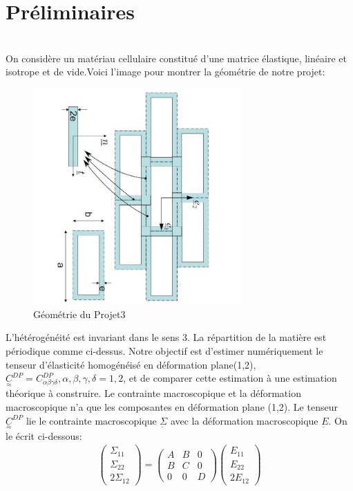 \documentclass{article}
\newcommand\waveC{\underset{\approx}{C}}
\begin{document}
\section{Préliminaires}\leavevmode \\
On considère un matériau cellulaire constitué d'une matrice élastique, linéaire et isotrope et de vide.Voici l'image pour montrer la géométrie de notre projet: 
\begin{figure}[h!]
    \begin{center}
    \includegraphics[width=8cm]{img/Géométrie_Projet3.JPG}
    \end{center}
    \caption{Géométrie du Projet3}
    \label{fig_géo générale}
\end{figure}
\par
L'hétérogénéité est invariant dans le sens 3. La répartition de la matière est périodique comme ci-dessus. Notre objectif est d'estimer numériquement le tenseur d'élasticité homogénéisé en déformation plane(1,2), $\waveC^{DP}=C^{DP}_{\alpha\beta\gamma\delta},\alpha,\beta,\gamma,\delta=1,2$, et de comparer cette estimation à une estimation théorique à construire. Le contrainte macroscopique et la déformation macroscopique n'a que les composantes en déformation plane (1,2). Le tenseur $\waveC^{DP}$ lie le contrainte macroscopique $\underset{\widetilde{}}{\Sigma}$ avec la déformation macroscopique $\underset{\widetilde{}}{E}$. On le écrit ci-dessous:\\
\begin{align*}
    \begin{pmatrix}
    \Sigma_{11}\\\Sigma_{22}\\2\Sigma_{12}
    \end{pmatrix} = 
    \begin{pmatrix}
    A & B & 0 \\ B & C & 0 \\ 0 & 0 & D
    \end{pmatrix}
    \begin{pmatrix}
    E_{11}\\E_{22}\\2E_{12}
    \end{pmatrix}
\end{align*}
\end{document}
